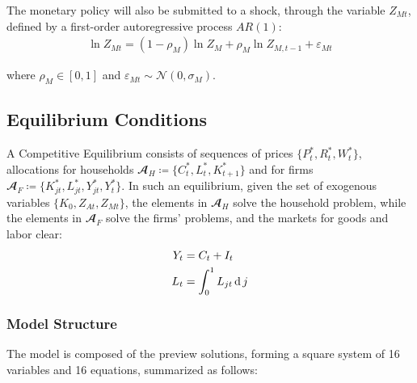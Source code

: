 \documentclass[
	thesis.tex
	]{subfiles}
\begin{document}
The monetary policy will also be submitted to a shock, through the variable $Z_{Mt}$, defined by a first-order autoregressive process $AR(1)$:
\begin{align}
	\ln{Z_{Mt}} = (1-\rho_M)\ln{Z_{M}} + \rho_M\ln{Z_{M,t-1}} + \varepsilon_{Mt} \label{eq:monetary-shock}
\end{align}

where $\rho_M \in [0,1]$ and $\varepsilon_{Mt} \sim \mathscr{N}(0,\sigma_M)$.


\subsection{Equilibrium Conditions}


A Competitive Equilibrium consists of sequences of prices $\{P_t^\ast, R_t^\ast, W_t^\ast\}$, allocations for households $\mathbfscr{A}_H \coloneq \{C_t^\ast, L_t^\ast, K_{t+1}^\ast\}$ and for firms $\mathbfscr{A}_F \coloneq \{K_{jt}^\ast, L_{jt}^\ast, Y_{jt}^\ast, Y_t^\ast\}$. In such an equilibrium, given the set of exogenous variables $\{K_0, Z_{At}, Z_{Mt}\}$, the elements in $\mathbfscr{A}_H$ solve the household problem, while the elements in $\mathbfscr{A}_F$ solve the firms' problems, and the markets for goods and labor clear:
\begin{align}
	Y_t &= C_t + I_t \label{eq:market-clearing-condition} \\
	L_t &= \int_{0}^{1} L_{jt} \operatorname{d} j \label{eq:market-clearing-condition-2}
\end{align}



\subsubsection{Model Structure}

The model is composed of the preview solutions, forming a square system of 16 variables and 16 equations, summarized as follows:
\end{document}
